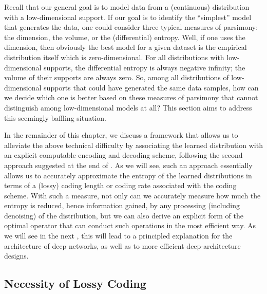 \documentclass[../../book-main.tex]{subfiles}
\begin{document}
Recall that our general goal is to model data from a (continuous) distribution
with a low-dimensional support. If our goal is to identify the ``simplest''
model that generates the data, one could consider three typical measures of
parsimony: the dimension, the volume, or the (differential) entropy. Well, if
one uses the dimension, then obviously the best model for a given dataset is the
empirical distribution itself which is zero-dimensional. For all distributions with low-dimensional supports, the differential entropy is always negative infinity; the volume of their supports are always zero. So,  among all distributions of low-dimensional supports that could have generated the same data samples, how can we decide which one is better based on these measures of parsimony that cannot distinguish among low-dimensional models at all? This section aims to address this seemingly baffling situation.

In the remainder of this chapter, we discuss a framework that allows us to alleviate the above technical difficulty by associating the learned distribution with an explicit computable encoding and decoding scheme, following the second approach suggested at the end of . As we will see, such an approach essentially allows us to accurately approximate the entropy of the learned distributions in terms of a (lossy) coding length or coding rate associated with the coding scheme. With such a measure, not only can we accurately measure how much the entropy is reduced, hence information gained, by any processing (including denoising) of the distribution, but we can also derive an explicit form of the optimal operator that can conduct such operations in the most efficient way. As we will see in the next , this will lead to a principled explanation for the architecture of deep networks, as well as to more efficient deep-architecture designs.

\subsection{Necessity of Lossy Coding}


\end{document}
